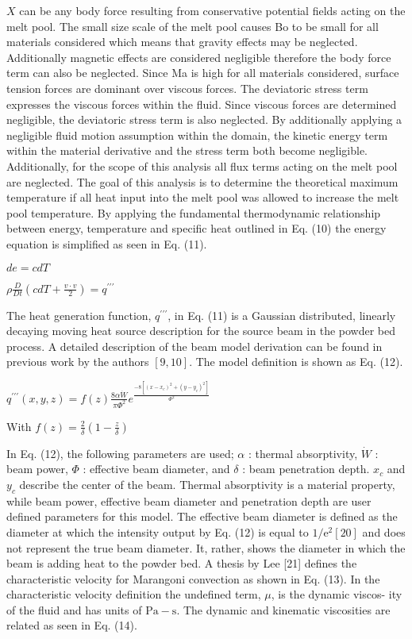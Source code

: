 \documentclass[10pt]{article}
\begin{document}
$X$ can be any body force resulting from conservative potential fields acting on the melt pool. The small size scale of the melt pool causes Bo to be small for all materials considered which means that gravity effects may be neglected. Additionally magnetic effects are considered negligible therefore the body force term can also be neglected. Since Ma is high for all materials considered, surface tension forces are dominant over viscous forces. The deviatoric stress term expresses the viscous forces within the fluid. Since viscous forces are determined negligible, the deviatoric stress term is also neglected. By additionally applying a negligible fluid motion assumption within the domain, the kinetic energy term within the material derivative and the stress term both become negligible. Additionally, for the scope of this analysis all flux terms acting on the melt pool are neglected. The goal of this analysis is to determine the theoretical maximum temperature if all heat input into the melt pool was allowed to increase the melt pool temperature. By applying the fundamental thermodynamic relationship between energy, temperature and specific heat outlined in Eq. (10) the energy equation is simplified as seen in Eq. (11).

$d e=c d T$

$\rho \frac{D}{D t}\left(c d T+\frac{v \cdot v}{2}\right)=q^{\prime \prime \prime}$

The heat generation function, $q^{\prime \prime \prime}$, in Eq. (11) is a Gaussian distributed, linearly decaying moving heat source description for the source beam in the powder bed process. A detailed description of the beam model derivation can be found in previous work by the authors $[9,10]$. The model definition is shown as Eq. (12).

$q^{\prime \prime \prime}(x, y, z)=f(z) \frac{8 \alpha \dot{W}}{\pi \Phi^{2}} e^{\frac{-8\left[\left(x-x_{c}\right)^{2}+\left(y-y_{c}\right)^{2}\right]}{\Phi^{2}}}$

With $f(z)=\frac{2}{\delta}\left(1-\frac{z}{\delta}\right)$

In Eq. (12), the following parameters are used; $\alpha$ : thermal absorptivity, $\dot{W}$ : beam power, $\Phi$ : effective beam diameter, and $\delta$ : beam penetration depth. $x_{c}$ and $y_{c}$ describe the center of the beam. Thermal absorptivity is a material property, while beam power, effective beam diameter and penetration depth are user defined parameters for this model. The effective beam diameter is defined as the diameter at which the intensity output by Eq. (12) is equal to $1 / \mathrm{e}^{2}[20]$ and does not represent the true beam diameter. It, rather, shows the diameter in which the beam is adding heat to the powder bed. A thesis by Lee [21] defines the characteristic velocity for Marangoni convection as shown in Eq. (13). In the characteristic velocity definition the undefined term, $\mu$, is the dynamic viscos- ity of the fluid and has units of $\mathrm{Pa}-\mathrm{s}$. The dynamic and kinematic viscosities are related as seen in Eq. (14).
\end{document}
